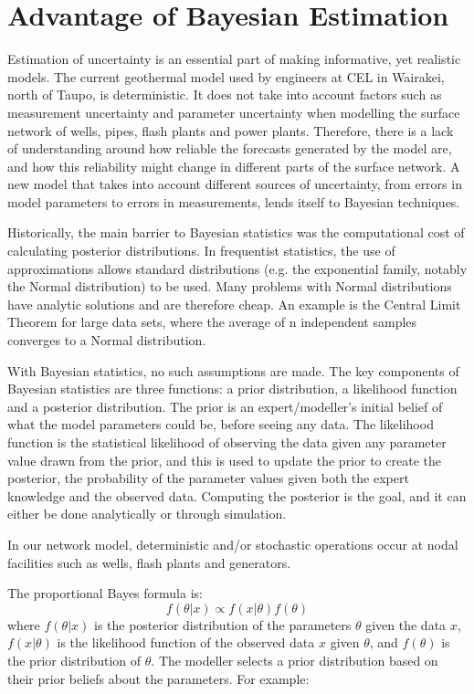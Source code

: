 \documentclass[a4paper, 12pt]{article}
\begin{document}
\section{Advantage of Bayesian Estimation}
Estimation of uncertainty is an essential part of making informative, yet realistic models. The current geothermal model used by engineers at CEL in Wairakei, north of Taupo, is deterministic. It does not take into account factors such as measurement uncertainty and parameter uncertainty when modelling the surface network of wells, pipes, flash plants and power plants. Therefore, there is a lack of understanding around how reliable the forecasts generated by the model are, and how this reliability might change in different parts of the surface network.
A new model that takes into account different sources of uncertainty, from errors in model parameters to errors in measurements, lends itself to Bayesian techniques. 

Historically, the main barrier to Bayesian statistics was the computational cost of calculating posterior distributions. In frequentist statistics, the use of approximations allows standard distributions (e.g. the exponential family, notably the Normal distribution) to be used. Many problems with Normal distributions have analytic solutions and are therefore cheap. An example is the Central Limit Theorem for large data sets, where the average of n independent samples converges to a Normal distribution.

With Bayesian statistics, no such assumptions are made. The key components of Bayesian statistics are three functions: a prior distribution, a likelihood function and a posterior distribution. The prior is an expert/modeller's initial belief of what the model parameters could be, before seeing any data. The likelihood function is the statistical likelihood of observing the data given any parameter value drawn from the prior, and this is used to update the prior to create the posterior, the probability of the parameter values given both the expert knowledge and the observed data. Computing the posterior is the goal, and it can either be done analytically or through simulation.

In our network model, deterministic and/or stochastic operations occur at nodal facilities such as wells, flash plants and generators.

The proportional Bayes formula is:
\begin{equation}
f(\theta|x) \propto f(x|\theta)f(\theta)
\end{equation}
where $f(\theta|x)$ is the posterior distribution of the parameters $\theta$ given the data $x$, $f(x|\theta)$ is the likelihood function of the observed data $x$ given $\theta$, and $f(\theta)$ is the prior distribution of $\theta$. The modeller selects a prior distribution based on their prior beliefs about the parameters. For example:
\end{document}
